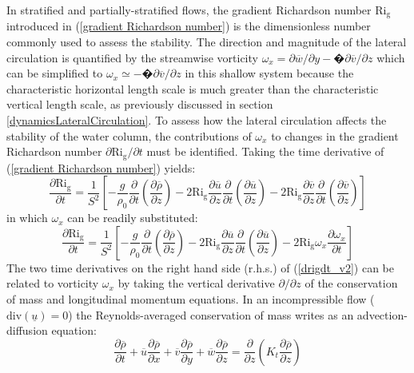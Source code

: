 In stratified and partially-stratified flows, the gradient Richardson number $\mathrm{Ri_g}$ introduced in (\ref{gradient Richardson number}) is the dimensionless number commonly used to assess the stability. The direction and magnitude of the lateral circulation is quantified by the streamwise vorticity $\omega_x = \partial \overline{w} / \partial y -�\partial \overline{v}/\partial z$ which can be simplified to $\omega_x \simeq -�\partial \overline{v}/\partial z$ in this shallow system because the characteristic horizontal length scale is much greater than the characteristic vertical length scale, as previously discussed in section \ref{dynamicsLateralCirculation}. To assess how the lateral circulation affects the stability of the water column, the contributions of $\omega_x$ to changes in the gradient Richardson number $\partial \mathrm{Ri_g} / \partial t$ must be identified. Taking the time derivative of (\ref{gradient Richardson number}) yields:
\begin{equation}
\frac{\partial \mathrm{Ri_g}}{\partial t} =  \frac{1}{S^2} \left[ -\frac{g}{\rho_0} \frac{\partial}{\partial t} \left( \frac{\partial \overline{\rho}}{\partial z}\right) - 2 \mathrm{Ri_g} \frac{\partial \overline{u}}{\partial z} \frac{\partial}{\partial t} \left( \frac{\partial \overline{u}}{\partial z}\right) -2 \mathrm{Ri_g} \frac{\partial \overline{v}}{\partial z} \frac{\partial}{\partial t} \left( \frac{\partial \overline{v}}{\partial z}\right)    \right]
\label{drigdt_v1}
\end{equation}
in which $\omega_x$ can be readily substituted:
\begin{equation}
\frac{\partial \mathrm{Ri_g}}{\partial t} =  \frac{1}{S^2} \left[ -\frac{g}{\rho_0} \frac{\partial}{\partial t} \left( \frac{\partial \overline{\rho}}{\partial z}\right) - 2 \mathrm{Ri_g} \frac{\partial \overline{u}}{\partial z} \frac{\partial}{\partial t} \left( \frac{\partial \overline{u}}{\partial z}\right) -2 \mathrm{Ri_g} \omega_x    \frac{\partial \omega_x}{\partial t}   \right]
\label{drigdt_v2}
\end{equation}
The two time derivatives on the right hand side (r.h.s.) of (\ref{drigdt_v2}) can be related to vorticity $\omega_x$ by taking the vertical derivative $\partial / \partial z$ of the conservation of mass and longitudinal momentum equations. In an incompressible flow ($\mathrm{div}(\underline{u})=0$) the Reynolds-averaged conservation of mass writes as an advection-diffusion equation:
\begin{equation}
\frac{\partial \overline{\rho}}{\partial t} + \overline{u} \frac{\partial \overline{\rho}}{\partial x} +  \overline{v} \frac{\partial \overline{\rho}}{\partial y} +  \overline{w} \frac{\partial \overline{\rho}}{\partial z} = \frac{\partial}{\partial z}\left( K_{t} \frac{\partial \overline{\rho}}{\partial z} \right)
\label{conservationOfMass}
\end{equation}
